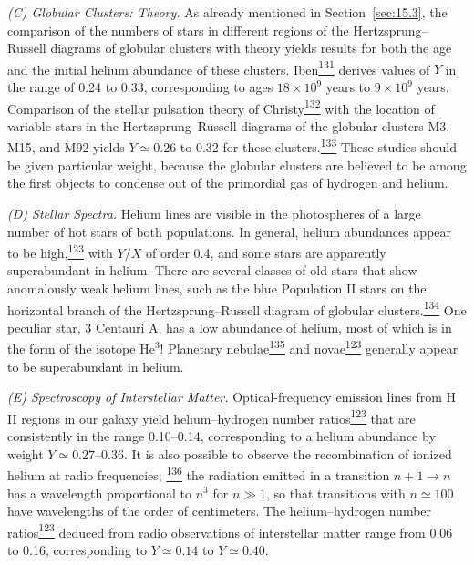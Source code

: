 \emph{(C) Globular Clusters: Theory.} As already mentioned in
Section~\ref{sec:15.3}, the comparison of the numbers of stars in different
regions of the Hertzsprung--Russell diagrams of globular clusters with theory
yields results for both the age and the initial helium abundance of these
clusters. Iben\hyperref[ch15-ref-131]{\textsuperscript{131}} derives values
of \(Y\) in the range of 0.24 to 0.33, corresponding to ages
\(18\times10^9\) years to \(9\times10^9\) years. Comparison of the stellar
pulsation theory of Christy\hyperref[ch15-ref-132]{\textsuperscript{132}}
with the location of variable stars in the Hertzsprung--Russell diagrams of
the globular clusters M3, M15, and M92 yields \(Y\simeq0.26\) to 0.32 for
these clusters.\hyperref[ch15-ref-133]{\textsuperscript{133}} These studies
should be given particular weight, because the globular clusters are believed
to be among the first objects to condense out of the primordial gas of
hydrogen and helium.

\emph{(D) Stellar Spectra.} Helium lines are visible in the photospheres of a
large number of hot stars of both populations. In general, helium abundances
appear to be high,\hyperref[ch15-ref-123]{\textsuperscript{123}} with \(Y/X\)
of order 0.4, and some stars are apparently superabundant in helium. There are
several classes of old stars that show anomalously weak helium lines, such as
the blue Population II stars on the horizontal branch of the
Hertzsprung--Russell diagram of globular
clusters.\hyperref[ch15-ref-134]{\textsuperscript{134}} One peculiar star,
3 Centauri A, has a low abundance of helium, most of which is in the form of
the isotope \(\mathrm{He}^3\)! Planetary
nebulae\hyperref[ch15-ref-135]{\textsuperscript{135}} and
novae\hyperref[ch15-ref-123]{\textsuperscript{123}} generally appear to be
superabundant in helium.

\emph{(E) Spectroscopy of Interstellar Matter.} Optical-frequency emission
lines from H II regions in our galaxy yield helium--hydrogen number
ratios\hyperref[ch15-ref-123]{\textsuperscript{123}} that are consistently
in the range 0.10--0.14, corresponding to a helium abundance by weight
\(Y\simeq0.27\)--0.36. It is also possible to observe the recombination of
ionized helium at radio frequencies;%
\hyperref[ch15-ref-136]{\textsuperscript{136}} the radiation emitted in a
transition \(n+1\to n\) has a wavelength proportional to \(n^3\) for
\(n\gg1\), so that transitions with \(n\simeq100\) have wavelengths of the
order of centimeters. The helium--hydrogen number
ratios\hyperref[ch15-ref-123]{\textsuperscript{123}} deduced from radio
observations of interstellar matter range from 0.06 to 0.16, corresponding to
\(Y\simeq0.14\) to \(Y\simeq0.40\).

